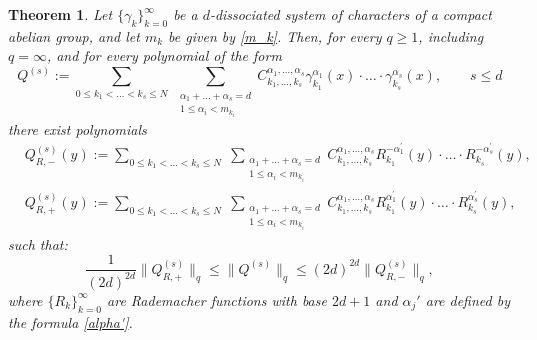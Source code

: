 \documentclass[10pt,a4paper]{amsart}
\newtheorem{theorem}{Theorem}
\begin{document}
	\begin{theorem} \label{th-0}
Let $\{\gamma_{k}\}_{k=0}^{\infty}$ be a $d$-dissociated system of characters of a compact abelian group, and let $m_k$ be given by \eqref{m_k}. Then, for every $q \ge 1$, including $q = \infty$, and for every polynomial of the form
		\[
		Q^{(s)} := \sum_{0\le k_1 < \ldots < k_s \le N} \; \sum_{\substack{\alpha_1+\ldots+\alpha_s = d \\ 1 \le \alpha_i < m_{k_i}}} C_{k_1, \ldots, k_s}^{\alpha_1, \ldots, \alpha_s} \gamma_{k_1}^{\alpha_1}(x) \cdot \ldots \cdot \gamma_{k_s}^{\alpha_s}(x), \qquad s \le d
		\]
		there exist polynomials 
		\begin{equation} \label{Q-s_R}
			\begin{split}
				& Q^{(s)}_{R, -}(y) := \sum_{0\le k_1 < \ldots < k_s \le N} \; \sum_{\substack{\alpha_1+\ldots+\alpha_s = d \\ 1 \le \alpha_i < m_{k_i}}} C_{k_1, \ldots, k_s}^{\alpha_1, \ldots, \alpha_s} R_{k_1}^{-\alpha^{\prime}_1}(y) \cdot \ldots \cdot R_{k_s}^{-\alpha^{\prime}_s}(y), \\
				& Q^{(s)}_{R, +}(y) := \sum_{0\le k_1 < \ldots < k_s \le N} \; \sum_{\substack{\alpha_1+\ldots+\alpha_s = d \\ 1 \le \alpha_i < m_{k_i}}} C_{k_1, \ldots, k_s}^{\alpha_1, \ldots, \alpha_s} R_{k_1}^{\alpha^{\prime}_1}(y) \cdot \ldots \cdot R_{k_s}^{\alpha^{\prime}_s}(y),
			\end{split}
		\end{equation}
		such that:
		\begin{equation} \label{th-0-main}
			\frac{1}{(2d)^{2d}} \|Q^{(s)}_{R, +}\|_q	\le \|Q^{(s)}\|_q \le (2d)^{2d} \|Q^{(s)}_{R, -}\|_q,
		\end{equation}
		where $\{R_{k}\}_{k=0}^{\infty}$ are Rademacher functions with base $2d+1$ and $\alpha_j'$ are defined by the formula \eqref{alpha'}.
	\end{theorem}
\end{document}

